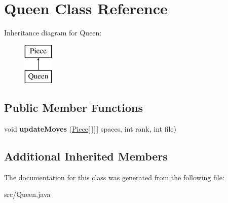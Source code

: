 \hypertarget{class_queen}{\section{Queen Class Reference}
\label{class_queen}
}
Inheritance diagram for Queen\-:\begin{figure}[H]
\begin{center}
\leavevmode
\includegraphics[height=2.000000cm]{class_queen}
\end{center}
\end{figure}
\subsection*{Public Member Functions}
\begin{DoxyCompactItemize}
\item 
\hypertarget{class_queen_a680fb8dbed426be9577d3b63cabc2a53}{void {\bfseries update\-Moves} (\hyperlink{class_piece}{Piece}\mbox{[}$\,$\mbox{]}\mbox{[}$\,$\mbox{]} spaces, int rank, int file)}\label{class_queen_a680fb8dbed426be9577d3b63cabc2a53}

\end{DoxyCompactItemize}
\subsection*{Additional Inherited Members}


The documentation for this class was generated from the following file\-:\begin{DoxyCompactItemize}
\item 
src/Queen.\-java\end{DoxyCompactItemize}
